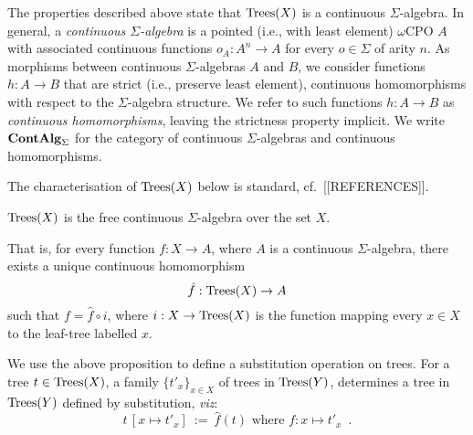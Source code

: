 The properties described above state that $\textnormal{Trees}(X)$ is a continuous $\Sigma$-algebra. In general,
a \emph{continuous $\Sigma$-algebra} is a pointed (i.e., with least element) $\omega$CPO $A$ with associated
continuous functions $o_A : A^n \to A$ for every $o \in \Sigma$ of arity $n$. 
As morphisms between continuous $\Sigma$-algebras
$A$ and $B$, we consider functions $h: A \to B$  that are strict (i.e., preserve least element), continuous homomorphisms with respect to the $\Sigma$-algebra structure. 
We refer to such  functions $h: A \to B$ as \emph{continuous homomorphisms}, leaving the strictness property implicit.
We write $\mathbf{ContAlg}_\Sigma$ for the category of continuous $\Sigma$-algebras and continuous homomorphisms.

The characterisation of $\textnormal{Trees}(X)$ below is standard, cf.\ [[REFERENCES]].
\begin{aproposition}
$\textnormal{Trees}(X)$ is the free
    continuous $\Sigma$-algebra over the set $X$.
   \begin{center}
    \end{center}
    That is, for every function $f : X \to A$, where 
    $A$ is a continuous $\Sigma$-algebra,
    there exists a unique continuous homomorphism $$\hat{f} : \textnormal{Trees}(X) \to A$$
    such that $
        f = \hat{f} \circ i $, where $i : X \to \textnormal{Trees}(X)$ is the function mapping every $x \in X$ to the 
        leaf-tree labelled $x$.
 \end{aproposition}
 
 We use the above proposition to define a substitution operation on trees. For a tree $t \in \textnormal{Trees}(X)$, 
 a family $\{t'_x\}_{x \in X}$ of trees in $\textnormal{Trees}(Y)$, determines a tree in $\textnormal{Trees}(Y)$ defined by substitution, \emph{viz}:
 \[t\,[x \mapsto t'_x] ~ := ~ \text{$\hat{f}(t)$ where $f \colon x \mapsto t'_x$} \enspace .
 \]
